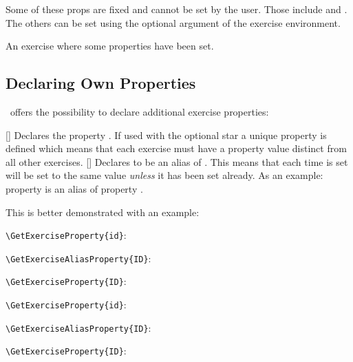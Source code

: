 \documentclass[load-preamble+]{cnltx-doc}
\begin{document}
Some of these \acsp*{prop} are fixed and cannot be set by the user.  Those
include  and .  The others can be set using the
optional argument of the exercise environment.

\begin{example}[outside]
  \begin{exercise}[points={4.5},subtitle={This is a subtitle}]
    An exercise where some properties have been set.
  \end{exercise}
\end{example}

\subsection{Declaring Own Properties}

\xsim\ offers the possibility to declare additional exercise properties:
\begin{commands}
  [\sarg{}]
    Declares the property .  If used with the optional star a
    unique property is defined which means that each exercise must have a
    property value distinct from all other exercises.
  []
    Declares  to be an alias of .  This
    means that each time  is set  will be
    set to the same value \emph{unless} it has been set already.  As an
    example: property  is an alias of property .
\end{commands}

This is better demonstrated with an example:
\begin{example}[outside]
  \begin{exercise}
    \lipsum[4] %
    \verb+\GetExerciseProperty{id}+:  \par
    \verb+\GetExerciseAliasProperty{ID}+:  \par
    \verb+\GetExerciseProperty{ID}+: 
  \end{exercise}
  \begin{exercise}[ID=foo-bar]
    \lipsum[4]
    \verb+\GetExerciseProperty{id}+:  \par
    \verb+\GetExerciseAliasProperty{ID}+:  \par
    \verb+\GetExerciseProperty{ID}+: 
  \end{exercise}
\end{example}
\end{document}
